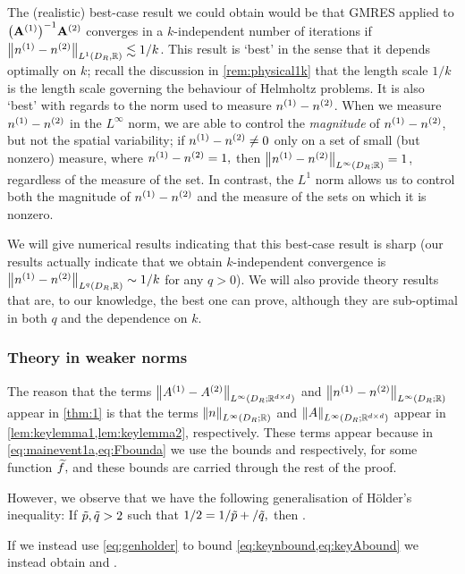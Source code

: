 The (realistic) best-case result we could obtain would be that GMRES applied to $\AmatoI\Amatt$ converges in a $k$-independent number of iterations if $\NLoDRRR{\nso-\nst} \lesssim 1/k$. This result is `best' in the sense that it depends optimally on $k$; recall the discussion in \cref{rem:physical1k} that the length scale $1/k$ is the length scale governing the behaviour of Helmholtz problems. It is also `best' with regards to the norm used to measure ${n}^{(1)}-{n}^{(2)}$. When we measure ${n}^{(1)}-{n}^{(2)}$ in the $L^\infty$ norm, we are able to control the \emph{magnitude} of ${n}^{(1)}-{n}^{(2)}$, but not the spatial variability; if ${n}^{(1)}-{n}^{(2)} \neq 0$ only on a set of small (but nonzero) measure, where ${n}^{(1)}-{n}^{(2)}=1,$ then $\NLiDRRR{\nso-\nst} = 1$, regardless of the measure of the set. In contrast, the $L^1$ norm allows us to control both the magnitude of ${n}^{(1)}-{n}^{(2)}$ and the measure of the sets on which it is nonzero.

We will give numerical results indicating that this best-case result is sharp (our results actually indicate that we obtain $k$-independent convergence is $\NLqDRRR{\nso-\nst}\sim 1/k$ for any $q>0$). We will also provide theory results that are, to our knowledge, the best one can prove, although they are sub-optimal in both $q$ and the dependence on $k.$


\subsubsection{Theory in weaker norms}\label{sec:weakertheory}
The reason that the terms $\NLiDRRRdtd{\Aso-\Ast}$ and $\NLiDRRR{\nso-\nst}$ appear in \cref{thm:1} is that the terms $\NLiDRRR{n}$ and $\NLiDRRRdtd{A}$ appear in \cref{lem:keylemma1,lem:keylemma2}, respectively. These terms appear because in \cref{eq:mainevent1a,eq:Fbounda} we use the bounds
\beq\label{eq:keynbound}
 \leq {}\NLtDR{\ftilde}
\eeq
and
\beq\label{eq:keyAbound}
 \leq {}\NLtDR{\grad \ftilde}
\eeq
respectively, for some function $\widetilde{f},$ and these bounds are carried through the rest of the proof.

However, we observe that we have the following generalisation of H\"older's inequality: If $\tilde{p},\tilde{q} > 2$ such that $1/2 = 1/\tilde{p} + /\tilde{q},$ then
\beq\label{eq:genholder}
\NLtDR{\vo\vt} \leq \NLptildeDR{\vo}\NLqtildeDR{\vt}.
\eeq

If we instead use \cref{eq:genholder} to bound \cref{eq:keynbound,eq:keyAbound} we instead obtain
\beq\label{eq:keynbound2}
 \leq {}\NLptildeDR{\ftilde}
\eeq
and
\beq\label{eq:keyAbound2}
 \leq {}\NLptildeDR{\ftilde}.
\eeq

